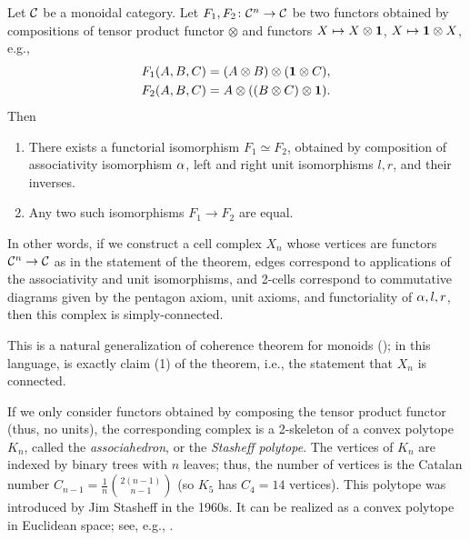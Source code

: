 \begin{theorem}\label{t:maclane}\par

  \noindent
  Let $\mathcal{C}$ be a monoidal category. Let $F_1, F_2\colon \mathcal{C}^n\to \mathcal{C}$
  be two functors obtained by compositions of tensor product functor $\otimes$
  and functors $X\mapsto X\otimes \mathbf{1}$, $X\mapsto \mathbf{1} \otimes X$, e.g.,
  \begin{align*}
    F_1(A,B,C)&=(A\otimes B)\otimes (\mathbf{1}\otimes C),\\
    F_2(A,B,C)&=A\otimes (( B\otimes  C)\otimes \mathbf{1}).
  \end{align*}
  Then

  \begin{enumerate}
    \item There exists a functorial isomorphism $F_1\simeq F_2$, obtained
      by composition of associativity isomorphism $\alpha$, left and right
      unit isomorphisms $l,r$, and their inverses.
    \item Any two such isomorphisms $F_1\to F_2$ are equal.
  \end{enumerate}

\end{theorem}
In other words, if we construct a cell complex $X_n$ whose vertices are functors
$\mathcal{C}^n\to \mathcal{C}$ as in the statement of the theorem, edges correspond to
applications of the associativity and unit isomorphisms, and 2-cells correspond
to commutative diagrams given by the pentagon axiom, unit axioms, and
functoriality of $\alpha, l, r$, then this complex is simply-connected.

This is a natural generalization of coherence theorem for monoids
(); in this language, 
is exactly claim (1) of the theorem, i.e., the statement that $X_n$
is connected.

\begin{remark}\label{r:stasheff}
  If we only consider functors obtained by composing the tensor product functor
  (thus, no units), the corresponding complex is a 2-skeleton of a convex
  polytope $K_n$, called the \emph{associahedron}, or the
  \emph{Stasheff
  polytope}. The vertices of $K_n$ are indexed by
  binary trees with $n$ leaves; thus, the number of vertices is the Catalan
  number $C_{n-1} = \frac{1}{n}\binom{2(n-1)}{n-1}$ (so $K_5$ has
  $C_4 = 14$ vertices).
  This polytope was introduced by Jim Stasheff in the 1960s. It can be realized
  as a convex polytope in Euclidean space; see, e.g.,
  .
\end{remark}

